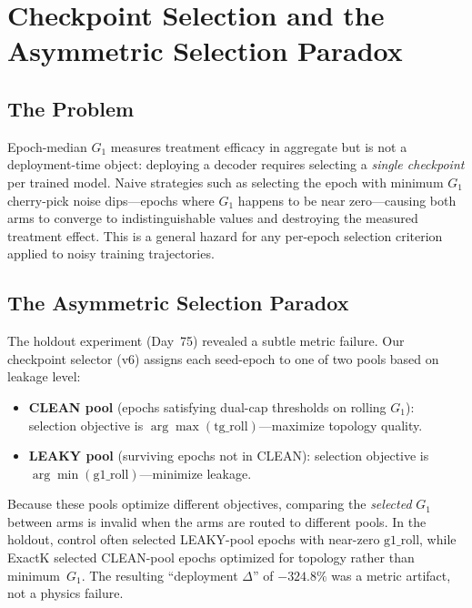 
\section{Checkpoint Selection and the Asymmetric Selection Paradox}
\label{sec:selector}

\subsection{The Problem}

Epoch-median $G_1$ measures treatment efficacy in aggregate but is not a deployment-time object: deploying a decoder requires selecting a \emph{single checkpoint} per trained model. Naive strategies such as selecting the epoch with minimum $G_1$ cherry-pick noise dips---epochs where $G_1$ happens to be near zero---causing both arms to converge to indistinguishable values and destroying the measured treatment effect. This is a general hazard for any per-epoch selection criterion applied to noisy training trajectories.

\subsection{The Asymmetric Selection Paradox}

The holdout experiment (Day~75) revealed a subtle metric failure. Our checkpoint selector (v6) assigns each seed-epoch to one of two pools based on leakage level:

\begin{itemize}
\item \textbf{CLEAN pool} (epochs satisfying dual-cap thresholds on rolling $G_1$): selection objective is $\arg\max(\mathrm{tg\_roll})$---maximize topology quality.
\item \textbf{LEAKY pool} (surviving epochs not in CLEAN): selection objective is $\arg\min(\mathrm{g1\_roll})$---minimize leakage.
\end{itemize}

Because these pools optimize different objectives, comparing the \emph{selected} $G_1$ between arms is invalid when the arms are routed to different pools. In the holdout, control often selected LEAKY-pool epochs with near-zero $\mathrm{g1\_roll}$, while ExactK selected CLEAN-pool epochs optimized for topology rather than minimum~$G_1$. The resulting ``deployment $\Delta$'' of $-324.8\%$ was a metric artifact, not a physics failure.

